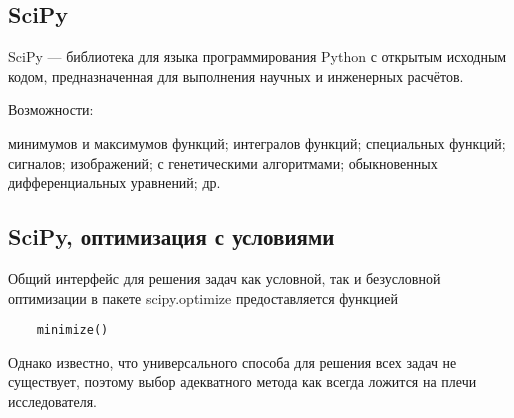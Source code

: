 \documentclass[12pt]{article} %
\begin{document}
\subsection{SciPy}
SciPy — библиотека для языка программирования Python с открытым исходным кодом, предназначенная для выполнения научных и инженерных расчётов.

Возможности:
\begin{itemize}
	 минимумов и максимумов функций;
	 интегралов функций;
	 специальных функций;
	 сигналов;
	 изображений;
	 с генетическими алгоритмами;
	 обыкновенных дифференциальных уравнений;
	 др.
\end{itemize}

\subsection{SciPy, оптимизация с условиями}
Общий интерфейс для решения задач как условной, так и безусловной оптимизации в пакете scipy.optimize предоставляется функцией\cite{2}
\begin{lstlisting}
	minimize()
\end{lstlisting}

Однако известно, что универсального способа для решения всех задач не существует, поэтому выбор адекватного метода как всегда ложится на плечи исследователя.\cite{2}
\end{document}
